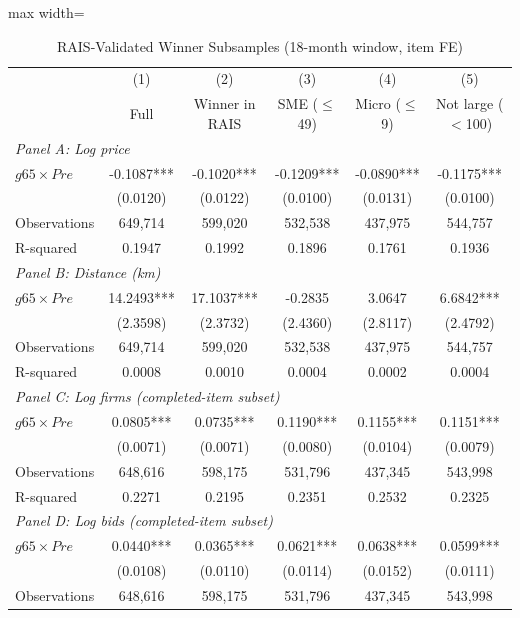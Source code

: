 \begin{table}[htbp]
\centering
\caption{RAIS-Validated Winner Subsamples (18-month window, item FE)}
\label{tab:rais_validation}
\begin{adjustbox}{max width=\textwidth}
\begin{threeparttable}
\small
\begin{tabular}{lccccc}
\toprule
 & (1) & (2) & (3) & (4) & (5) \\
 & Full & Winner in RAIS & SME ($\leq$49) & Micro ($\leq$9) & Not large ($<$100) \\
\midrule
\multicolumn{6}{l}{\textit{Panel A: Log price}} \\
$g65 \times Pre$ & -0.1087*** & -0.1020*** & -0.1209*** & -0.0890*** & -0.1175*** \\
 & (0.0120) & (0.0122) & (0.0100) & (0.0131) & (0.0100) \\
Observations & 649,714 & 599,020 & 532,538 & 437,975 & 544,757 \\
R-squared & 0.1947 & 0.1992 & 0.1896 & 0.1761 & 0.1936 \\
\midrule
\multicolumn{6}{l}{\textit{Panel B: Distance (km)}} \\
$g65 \times Pre$ & 14.2493*** & 17.1037*** & -0.2835 & 3.0647 & 6.6842*** \\
 & (2.3598) & (2.3732) & (2.4360) & (2.8117) & (2.4792) \\
Observations & 649,714 & 599,020 & 532,538 & 437,975 & 544,757 \\
R-squared & 0.0008 & 0.0010 & 0.0004 & 0.0002 & 0.0004 \\
\midrule
\multicolumn{6}{l}{\textit{Panel C: Log firms (completed-item subset)}} \\
$g65 \times Pre$ & 0.0805*** & 0.0735*** & 0.1190*** & 0.1155*** & 0.1151*** \\
 & (0.0071) & (0.0071) & (0.0080) & (0.0104) & (0.0079) \\
Observations & 648,616 & 598,175 & 531,796 & 437,345 & 543,998 \\
R-squared & 0.2271 & 0.2195 & 0.2351 & 0.2532 & 0.2325 \\
\midrule
\multicolumn{6}{l}{\textit{Panel D: Log bids (completed-item subset)}} \\
$g65 \times Pre$ & 0.0440*** & 0.0365*** & 0.0621*** & 0.0638*** & 0.0599*** \\
 & (0.0108) & (0.0110) & (0.0114) & (0.0152) & (0.0111) \\
Observations & 648,616 & 598,175 & 531,796 & 437,345 & 543,998 \\

\end{tabular}
\end{threeparttable}
\end{adjustbox}
\end{table}
